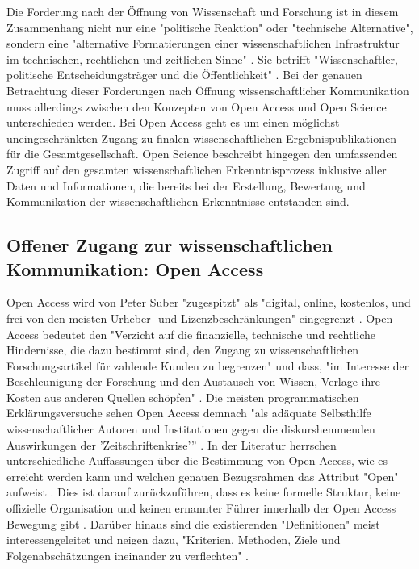 Die Forderung nach der Öffnung von Wissenschaft und Forschung ist in diesem Zusammenhang nicht nur eine "politische Reaktion" oder "technische Alternative", sondern eine "alternative Formatierungen einer wissenschaftlichen Infrastruktur im technischen, rechtlichen und zeitlichen Sinne" \cite{kelty_2004}. Sie betrifft "Wissenschaftler, politische Entscheidungsträger und die Öffentlichkeit" \cite{Scheliga_2014}. Bei der genauen Betrachtung dieser Forderungen nach Öffnung wissenschaftlicher Kommunikation muss allerdings zwischen den Konzepten von Open Access und Open Science unterschieden werden. Bei Open Access geht es um einen möglichst uneingeschränkten Zugang zu finalen wissenschaftlichen Ergebnispublikationen für die Gesamtgesellschaft. Open Science beschreibt hingegen den umfassenden Zugriff auf den gesamten wissenschaftlichen Erkenntnisprozess inklusive aller Daten und Informationen, die bereits bei der Erstellung, Bewertung und Kommunikation der wissenschaftlichen Erkenntnisse entstanden sind.

\subsection{Offener Zugang zur wissenschaftlichen Kommunikation: Open Access}

Open Access wird von Peter Suber "zugespitzt" \cite{naeder_2010_open} als "digital, online, kostenlos, und frei von den meisten Urheber- und Lizenzbeschränkungen" \cite{suber_2012_open} eingegrenzt \cite{Adema_2014_open_access}. Open Access bedeutet den "Verzicht auf die finanzielle, technische und rechtliche Hindernisse, die dazu bestimmt sind, den Zugang zu wissenschaftlichen Forschungsartikel für zahlende Kunden zu begrenzen" und dass, "im Interesse der Beschleunigung der Forschung und den Austausch von Wissen, Verlage ihre Kosten aus anderen Quellen schöpfen" \cite{Suber_2002}. Die meisten programmatischen Erklärungsversuche sehen Open Access demnach "als adäquate Selbsthilfe wissenschaftlicher Autoren und Institutionen gegen die diskurshemmenden Auswirkungen der 'Zeitschriftenkrise'” \cite{naeder_2010_open}. In der Literatur herrschen unterschiedliche Auffassungen über die Bestimmung von Open Access, wie es erreicht werden kann und welchen genauen Bezugsrahmen das Attribut "Open" aufweist \cite{Adema_2014_open_access} \cite{cite:17}. Dies ist darauf zurückzuführen, dass es keine formelle Struktur, keine offizielle Organisation und keinen ernannter Führer innerhalb der Open Access Bewegung gibt \cite{poynder_2011_suber}. Darüber hinaus sind die existierenden "Definitionen" meist interessengeleitet und neigen dazu, "Kriterien, Methoden, Ziele und Folgenabschätzungen ineinander zu verflechten" \cite{naeder_2010_open}.

